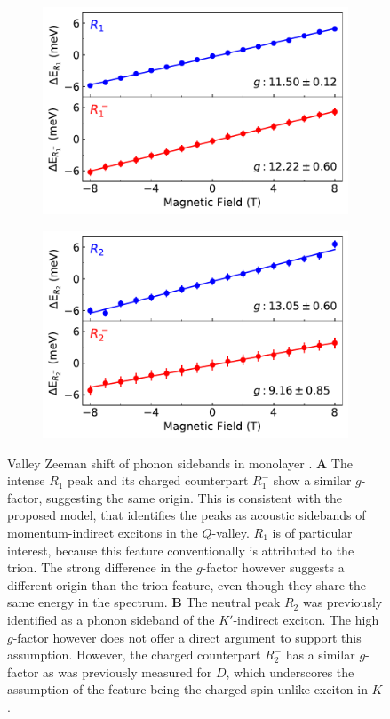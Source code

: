 \begin{figure}[t]
	\begin{subfigure}{0.49\textwidth}
		\caption{}
		\includegraphics[width=\textwidth]{G_R1}
	\end{subfigure}
	\begin{subfigure}{0.49\textwidth}
		\caption{}
		\includegraphics[width=\textwidth]{G_R2}
	\end{subfigure}
	\caption{Valley Zeeman shift of phonon sidebands in monolayer \wse. \textbf{A} The intense $R_1$ peak and its charged counterpart $R^-_1$ show a similar $g$-factor, suggesting the same origin. This is consistent with the proposed model, that identifies the peaks as acoustic sidebands of momentum-indirect excitons in the $Q$-valley. $R_1$ is of particular interest, because this feature conventionally is attributed to the trion. The strong difference in the $g$-factor however suggests a different origin than the trion feature, even though they share the same energy in the spectrum. \textbf{B} The neutral peak $R_2$ was previously identified as a phonon sideband of the $K'$-indirect exciton. The high $g$-factor however does not offer a direct argument to support this assumption. However, the charged counterpart $R^-_2$ has a similar $g$-factor as was previously measured for $D$, which underscores the assumption of the feature being the charged spin-unlike exciton in $K$. } 
	\label{Rfits}
\end{figure}

